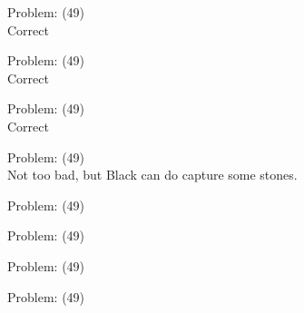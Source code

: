 \documentclass[11pt]{article}
\begin{document}
\begin{minipage}[t]{0.5\textwidth}
  {\centering
  
Problem: (49)\\
Correct\\
  }
\end{minipage}
\begin{minipage}[t]{0.5\textwidth}
  {\centering
  
Problem: (49)\\
Correct\\
  }
\end{minipage}
\begin{minipage}[t]{0.5\textwidth}
  {\centering
  
Problem: (49)\\
Correct\\
  }
\end{minipage}
\begin{minipage}[t]{0.5\textwidth}
  {\centering
  
Problem: (49)\\
Not too bad, but Black can do capture some stones.\\
  }
\end{minipage}
\begin{minipage}[t]{0.5\textwidth}
  {\centering
  
Problem: (49)\\
  }
\end{minipage}
\begin{minipage}[t]{0.5\textwidth}
  {\centering
  
Problem: (49)\\
  }
\end{minipage}
\begin{minipage}[t]{0.5\textwidth}
  {\centering
  
Problem: (49)\\
  }
\end{minipage}
\begin{minipage}[t]{0.5\textwidth}
  {\centering
  
Problem: (49)\\
  }
\end{minipage}
\end{document}

